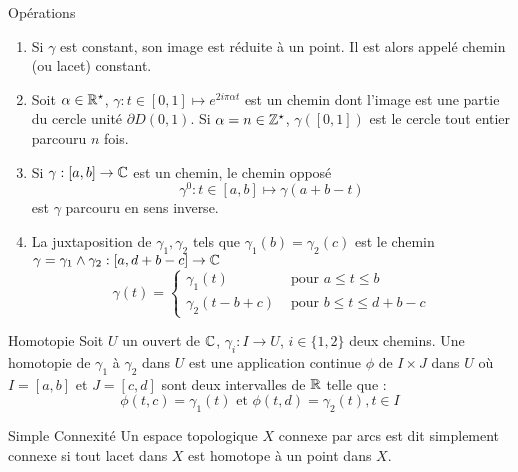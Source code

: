 \documentclass{cours}
\begin{document}
\begin{définition}{Opérations}{}
    \begin{enumerate}
        \item Si $\gamma$ est constant, son image est réduite à un point. Il est alors appelé chemin (ou lacet) constant.
        \item Soit $\alpha \in \mathbb{R}^{\star}$, $\gamma : t \in [0, 1] \mapsto e^{2i\pi \alpha t}$ est un chemin dont l'image est une partie du cercle unité $\partial D(0, 1)$. Si $\alpha = n \in \mathbb{Z}^{\star}$, $\gamma\left([0, 1]\right)$ est le cercle tout entier parcouru $n$ fois. 
        \item Si $\gamma : [a, b] \to \mathbb{C}$ est un chemin, le chemin opposé 
        \[
            \gamma^{0} : t \in [a, b] \mapsto \gamma(a + b - t)
        \]
        est $\gamma$ parcouru en sens inverse. 
        \item La juxtaposition de $\gamma_{1}, \gamma_{2}$ tels que $\gamma_{1}(b) = \gamma_{2}(c)$ est le chemin $\gamma = \gamma_{1} \land \gamma_{2} : \left[a, d + b - c\right] \to \mathbb{C}$
        \[
            \gamma(t) = \begin{cases}
                \gamma_{1}(t) & \text{ pour } a\leq t \leq b\\
            \gamma_{2}(t - b + c ) & \text{ pour } b \leq t \leq d + b - c
            \end{cases}
        \]
    \end{enumerate}
\end{définition}

\begin{définition}{Homotopie}{}
    Soit $U$ un ouvert de $\mathbb{C}$, $\gamma_{i} : I \to U$, $i \in \{1, 2\}$ deux chemins. Une homotopie de $\gamma_{1}$ à $\gamma_{2}$ dans $U$ est une application continue $\phi$ de $I \times J$ dans $U$ où $I = [a, b]$ et $J = [c, d]$ sont deux intervalles de $\mathbb{R}$ telle que : 
    \[
        \phi(t, c) = \gamma_{1}(t) \text{ et } \phi(t, d) = \gamma_{2}(t), t\in I
    \]
\end{définition}

\begin{définition}{Simple Connexité}{}
    Un espace topologique $X$ connexe par arcs est dit simplement connexe si tout lacet dans $X$ est homotope à un point dans $X$. 
\end{définition}
\end{document}
